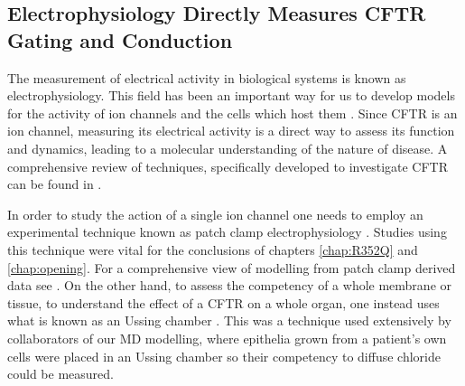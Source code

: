 \subsection{Electrophysiology Directly Measures CFTR Gating and Conduction}
The measurement of electrical activity in biological systems is known as electrophysiology. This field has been an important way for us to develop models for the activity of ion channels and the cells which host them \cite{aidley1996}. Since CFTR is an ion channel, measuring its electrical activity is a direct way to assess its function and dynamics, leading to a molecular understanding of the nature of disease. A comprehensive review of techniques, specifically developed to investigate CFTR can be found in \cite{cui2021}.

In order to study the action of a single ion channel one needs to employ an experimental technique known as patch clamp electrophysiology \cite{hille2001}. Studies using this technique were vital for the conclusions of chapters \ref{chap:R352Q} and \ref{chap:opening}. For a comprehensive view of modelling from patch clamp derived data see \cite{cai2011}. On the other hand, to assess the competency of a whole membrane or tissue, to understand the effect of a CFTR on a whole organ, one instead uses what is known as an Ussing chamber \cite{hoenig2014}. This was a technique used extensively by collaborators of our MD modelling, where epithelia grown from a patient's own cells were placed in an Ussing chamber so their competency to diffuse chloride could be measured.

